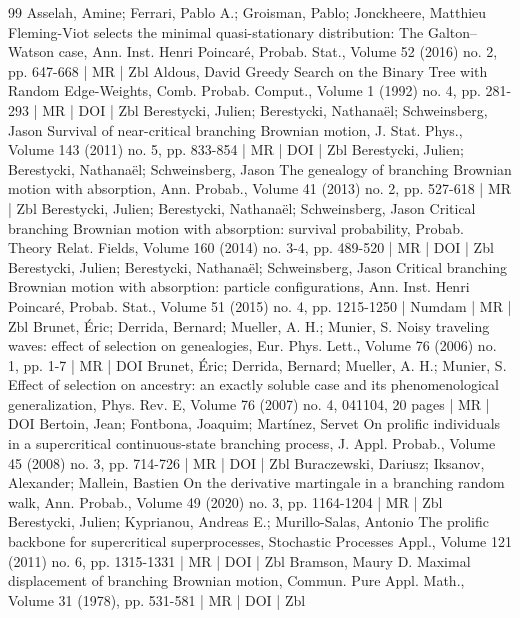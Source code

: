 \begin{thebibliography}{99}
Asselah, Amine; Ferrari, Pablo A.; Groisman, Pablo; Jonckheere, Matthieu Fleming-Viot selects the minimal quasi-stationary distribution: The Galton–Watson case, Ann. Inst. Henri Poincaré, Probab. Stat., Volume 52 (2016) no. 2, pp. 647-668 | MR | Zbl
Aldous, David Greedy Search on the Binary Tree with Random Edge-Weights, Comb. Probab. Comput., Volume 1 (1992) no. 4, pp. 281-293 | MR | DOI | Zbl
Berestycki, Julien; Berestycki, Nathanaël; Schweinsberg, Jason Survival of near-critical branching Brownian motion, J. Stat. Phys., Volume 143 (2011) no. 5, pp. 833-854 | MR | DOI | Zbl
Berestycki, Julien; Berestycki, Nathanaël; Schweinsberg, Jason The genealogy of branching Brownian motion with absorption, Ann. Probab., Volume 41 (2013) no. 2, pp. 527-618 | MR | Zbl
Berestycki, Julien; Berestycki, Nathanaël; Schweinsberg, Jason Critical branching Brownian motion with absorption: survival probability, Probab. Theory Relat. Fields, Volume 160 (2014) no. 3-4, pp. 489-520 | MR | DOI | Zbl
Berestycki, Julien; Berestycki, Nathanaël; Schweinsberg, Jason Critical branching Brownian motion with absorption: particle configurations, Ann. Inst. Henri Poincaré, Probab. Stat., Volume 51 (2015) no. 4, pp. 1215-1250 | Numdam | MR | Zbl
Brunet, Éric; Derrida, Bernard; Mueller, A. H.; Munier, S. Noisy traveling waves: effect of selection on genealogies, Eur. Phys. Lett., Volume 76 (2006) no. 1, pp. 1-7 | MR | DOI
Brunet, Éric; Derrida, Bernard; Mueller, A. H.; Munier, S. Effect of selection on ancestry: an exactly soluble case and its phenomenological generalization, Phys. Rev. E, Volume 76 (2007) no. 4, 041104, 20 pages | MR | DOI
Bertoin, Jean; Fontbona, Joaquim; Martínez, Servet On prolific individuals in a supercritical continuous-state branching process, J. Appl. Probab., Volume 45 (2008) no. 3, pp. 714-726 | MR | DOI | Zbl
Buraczewski, Dariusz; Iksanov, Alexander; Mallein, Bastien On the derivative martingale in a branching random walk, Ann. Probab., Volume 49 (2020) no. 3, pp. 1164-1204 | MR | Zbl
Berestycki, Julien; Kyprianou, Andreas E.; Murillo-Salas, Antonio The prolific backbone for supercritical superprocesses, Stochastic Processes Appl., Volume 121 (2011) no. 6, pp. 1315-1331 | MR | DOI | Zbl
Bramson, Maury D. Maximal displacement of branching Brownian motion, Commun. Pure Appl. Math., Volume 31 (1978), pp. 531-581 | MR | DOI | Zbl

\end{thebibliography}
